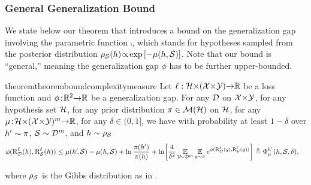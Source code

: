 \documentclass[twoside]{article}
\theoremstyle{plain}
\newif\ifnotappendix
\begin{document}
\subsubsection{General Generalization Bound}
\label{sec:result-general}

We state below our theorem that introduces a bound on the generalization gap involving the parametric function $\comp$, which stands for hypotheses sampled from the posterior distribution $\AQ(h) \!\propto\! \exp\LB-\!\comp(h, \Scal)\RB$.
Note that our bound is ``general,'' meaning the generalization gap $\phi$ has to be further upper-bounded.

\begin{restatable}{theorem}{theoremboundcomplexitymeasure}\label{theorem:disintegrated-comp}
Let $\loss: \Hcal{\times}(\Xcal{\times}\Ycal){\to}\R$ be a loss function and $\phi\!:\! \R^2{\to}\R$ be a generalization gap.
For any $\Dcal$ on $\Xcal{\times}\Ycal$, for any hypothesis set $\Hcal$, for any prior distribution $\P\in\Mcal(\Hcal)$ on $\Hcal$, for any $\comp\!:\! \Hcal{\times}(\Xcal{\times}\Ycal)^m{\to}\R$, for any $\delta\!\in\!(0, 1]$, we have with probability at least $1-\delta$ over $h'\sim\P$, $\Scal\sim\Dcal^m$, and $h\sim\AQ$
\ifnotappendix%
\begin{align*}
    \phi(\RiskLoss_{\Dcal}(h), \RiskLoss_{\Scal}(h)) &\le \comp(h'\!,\Scal) - \comp(h,\Scal) +\ln\frac{\P(h')}{\P(h)}\\[-1.5mm]
    &+ \ln\!\left[\frac{4}{\delta^2} \EE_{\Vcal\!{\sim}\Dcal^m}\EE_{g{\sim}\P} e^{\phi(\RiskLoss_{\Dcal}(g),\RiskLoss_{\Vcal}(g))}\right]\\
    &\defeq \PhiComp^{h'}(h,\Scal,\delta),
\end{align*}
\else%
\begin{align*}
    \phi(\RiskLoss_{\Dcal}(h), \RiskLoss_{\Scal}(h)) &\le \comp(h'\!,\Scal) - \comp(h,\Scal) +\ln\frac{\P(h')}{\P(h)} + \ln\!\left[\frac{4}{\delta^2} \EE_{\Vcal\!{\sim}\Dcal^m}\EE_{g{\sim}\P} e^{\phi(\RiskLoss_{\Dcal}(g),\RiskLoss_{\Vcal}(g))}\right] \defeq \PhiComp^{h'}(h,\Scal,\delta),
\end{align*}
\fi
where $\AQ$ is the Gibbs distribution as in .
\end{restatable}
\end{document}

